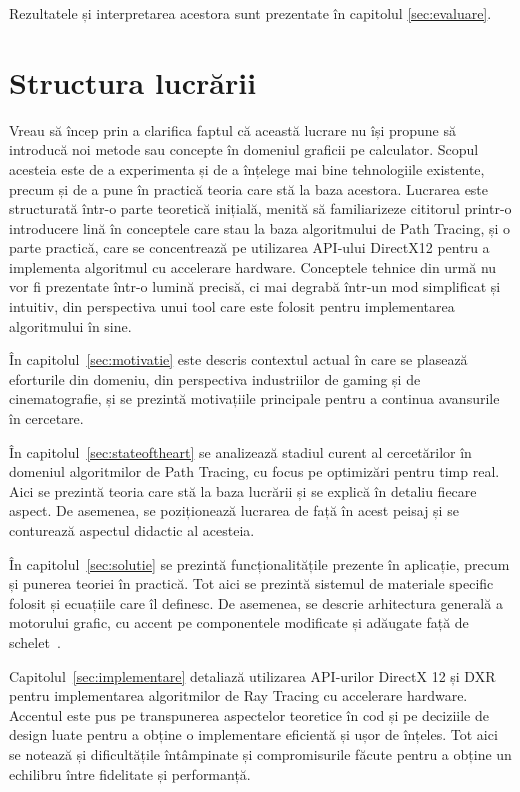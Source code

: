 \documentclass[12pt,a4paper]{report}
\numberwithin{equation}{section} %
\begin{document}
Rezultatele și interpretarea acestora sunt prezentate în capitolul \ref{sec:evaluare}.

\section{Structura lucrării}

Vreau să încep prin a clarifica faptul că această lucrare nu își propune să introducă
noi metode sau concepte în domeniul graficii pe calculator. Scopul acesteia
este de a experimenta și de a înțelege mai bine tehnologiile existente, precum
și de a pune în practică teoria care stă la baza acestora. Lucrarea este structurată
într-o parte teoretică inițială, menită să familiarizeze cititorul printr-o introducere lină
în conceptele care stau la baza algoritmului de Path Tracing, și o parte practică,
care se concentrează pe utilizarea API-ului DirectX12 pentru a implementa algoritmul
cu accelerare hardware. Conceptele tehnice din urmă nu vor fi prezentate
într-o lumină precisă, ci mai degrabă într-un mod simplificat și intuitiv, din
perspectiva unui tool care este folosit pentru implementarea algoritmului în sine.

În capitolul~\ref{sec:motivatie} este descris contextul actual în care se plasează
eforturile din domeniu, din perspectiva industriilor de gaming și de cinematografie,
și se prezintă motivațiile principale pentru a continua avansurile în cercetare.

În capitolul~\ref{sec:stateoftheart} se analizează stadiul curent al cercetărilor
în domeniul algoritmilor de Path Tracing, cu focus pe optimizări pentru timp real.
Aici se prezintă teoria care stă la baza lucrării și se explică în detaliu fiecare
aspect.
De asemenea, se poziționează lucrarea de față în acest peisaj și se conturează
aspectul didactic al acesteia.

În capitolul~\ref{sec:solutie} se prezintă funcționalitățile prezente în aplicație,
precum și punerea teoriei în practică. Tot aici se prezintă sistemul de materiale
specific folosit și ecuațiile care îl definesc. De asemenea, se descrie arhitectura
generală a motorului grafic, cu accent pe componentele modificate și adăugate
față de schelet~\cite{Schelet}.

Capitolul~\ref{sec:implementare} detaliază utilizarea API-urilor DirectX 12 și DXR
pentru implementarea algoritmilor de Ray Tracing cu accelerare hardware. Accentul
este pus pe transpunerea aspectelor teoretice în cod și pe deciziile de design luate pentru a obține o implementare
eficientă și ușor de înțeles. Tot aici se notează și dificultățile întâmpinate
și compromisurile făcute pentru a obține un echilibru între fidelitate și performanță.
\end{document}
